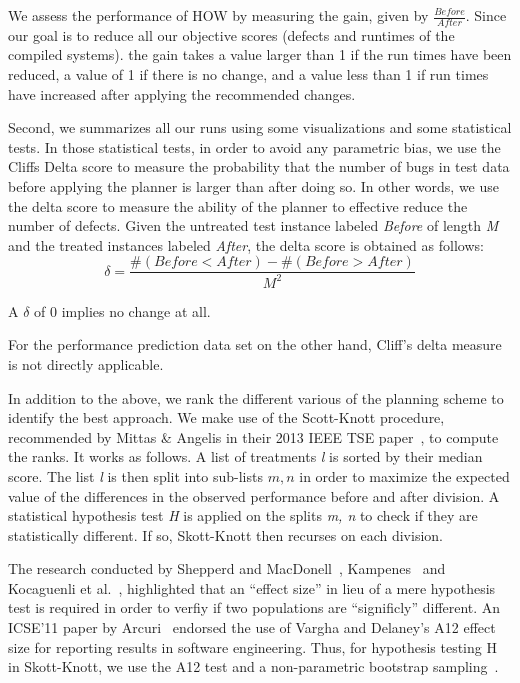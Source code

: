 \documentclass[conference]{IEEEtran}
\begin{document}


 
We  assess the performance of HOW  by measuring the gain, given by $\frac{Before}{After}$. Since
our goal is to reduce all our objective scores (defects and runtimes of the compiled systems).
the gain takes a value larger than 1 if the run times have been reduced, a value of 1 if there is no change, and a value less than 1 if run times have increased after applying the recommended changes. 


Second, we summarizes all our runs using some visualizations and some statistical tests.
In those statistical tests, in  order to avoid any parametric bias,
we use the Cliffs Delta score to measure the probability that the number of bugs in test data before applying the planner is larger than after doing so. In other words, we use the delta score to measure the ability of the planner to effective reduce the number of defects. Given the untreated test instance labeled \textit{Before} of length \textit{M} and the treated instances labeled \textit{After}, the delta score is obtained as follows:
\begin{equation}
\delta = \frac{\#(Before<After) - \#(Before>After)}{M^2}
\label{eq:cliffs}
\end{equation}

A $\delta$ of  0 implies no change at all. 

For the performance prediction data set on the other hand, Cliff's delta measure is not directly applicable.


In addition to the above, we rank the different various of the planning scheme to identify the best approach. We make use of the Scott-Knott procedure, recommended by Mittas \& Angelis in their 2013 IEEE TSE paper~\cite{sk}, to compute the ranks. It works as follows. A list of treatments \textit{l} is sorted by their median score. The list \textit{l} is then split into sub-lists $m, n$ in order to maximize the expected value of the differences in the observed performance before and after division. A statistical hypothesis test \textit{H} is applied on the splits \textit{m, n} to check if they are statistically different. If so, Skott-Knott then recurses on each division. 

The research conducted by Shepperd and MacDonell~\cite{shepperd12a}, Kampenes~\cite{kampenes07} and Kocaguenli et al.~\cite{}, highlighted that an ``effect size'' in lieu of a mere hypothesis test is required in order to verfiy if two populations are ``significly'' different. An ICSE'11 paper by Arcuri~\cite{} endorsed the use of Vargha and Delaney's A12 effect size for reporting results in software engineering. Thus, for hypothesis testing H in Skott-Knott, we use the A12 test and a non-parametric bootstrap sampling~\cite{}.
\end{document}
